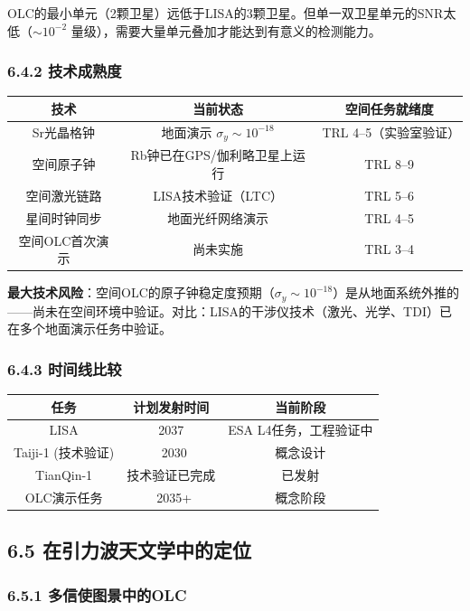 \documentclass[12pt,a4paper]{article}
\begin{document}
OLC的最小单元（2颗卫星）远低于LISA的3颗卫星。但单一双卫星单元的SNR太低（$\sim 10^{-2}$ 量级），需要大量单元叠加才能达到有意义的检测能力。

\subsubsection{6.4.2 技术成熟度}


\begin{tabular}{|c|c|c|}
\hline
技术 & 当前状态 & 空间任务就绪度 \\
\hline
Sr光晶格钟 & 地面演示 $\sigma_y \sim 10^{-18}$ & TRL 4–5（实验室验证） \\
空间原子钟 & Rb钟已在GPS/伽利略卫星上运行 & TRL 8–9 \\
空间激光链路 & LISA技术验证（LTC） & TRL 5–6 \\
星间时钟同步 & 地面光纤网络演示 & TRL 4–5 \\
空间OLC首次演示 & 尚未实施 & TRL 3–4 \\
\hline
\end{tabular}


\textbf{最大技术风险}：空间OLC的原子钟稳定度预期（$\sigma_y \sim 10^{-18}$）是从地面系统外推的——尚未在空间环境中验证。对比：LISA的干涉仪技术（激光、光学、TDI）已在多个地面演示任务中验证。

\subsubsection{6.4.3 时间线比较}


\begin{tabular}{|c|c|c|}
\hline
任务 & 计划发射时间 & 当前阶段 \\
\hline
LISA & 2037 & ESA L4任务，工程验证中 \\
Taiji-1 (技术验证) & ~2030 & 概念设计 \\
TianQin-1 & 技术验证已完成 & 已发射 \\
OLC演示任务 & ~2035+ & 概念阶段 \\
\hline
\end{tabular}


\subsection{6.5 在引力波天文学中的定位}


\subsubsection{6.5.1 多信使图景中的OLC}
\end{document}
